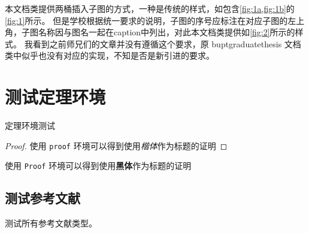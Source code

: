 本文档类提供两桶插入子图的方式，一种是传统的样式，如包含\cref{fig:1a,fig:1b}的\cref{fig:1}所示。
但是学校根据统一要求的说明，子图的序号应标注在对应子图的左上角，子图名称因与图名一起在caption中列出，对此本文档类提供如\cref{fig:2}所示的样式。
我看到之前师兄们的文章并没有遵循这个要求，原 buptgraduatethesis 文档类中似乎也没有对应的实现，不知是否是新引进的要求。

\section{测试定理环境}
\begin{theorem}[定理名称]
    定理环境测试
\end{theorem}

\begin{proof}
    使用 \texttt{proof} 环境可以得到使用\emph{楷体}作为标题的证明
\end{proof}

\begin{Proof}
    使用 \texttt{Proof} 环境可以得到使用\textbf{黑体}作为标题的证明
\end{Proof}

\subsection{测试参考文献}
测试所有参考文献类型\cite{CITATION_BOOK,CITATION_ARTICLE,CITATION_PROCEEDINGS,CITATION_INPROCEEDINGS,CITATION_TECHREPORT,CITATION_STANDARD,CITATION_PATENT,CITATION_NEWSPAPER,CITATION_ELECTRONIC}。

\chapterbib
